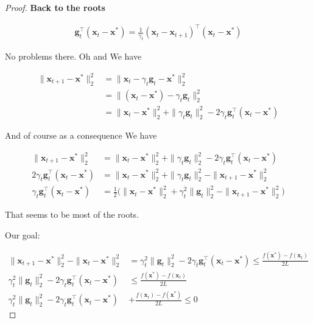 \documentclass{article}
\begin{document}
\begin{proof}
	\textbf{Back to the roots}
	
	\begin{align}
		\mathbf{g}_t^\top(\mathbf{x}_t - \mathbf{x}^*) = \frac{1}{\gamma_t}(\mathbf{x}_t - \mathbf{x}_{t+1})^\top (\mathbf{x}_t - \mathbf{x}^*)
	\end{align}
	
	No problems there. Oh and We have
	
	\begin{align}
		\|\mathbf{x}_{t+1} - \mathbf{x}^*\|^2_2 &= \|\mathbf{x}_t - \gamma_t\mathbf{g}_t - \mathbf{x}^*\|^2_2\\
		&= \|(\mathbf{x}_t - \mathbf{x}^*) - \gamma_t\mathbf{g}_t \|^2_2\\
		&= \|\mathbf{x}_t - \mathbf{x}^*\|^2_2 + \|\gamma_t\mathbf{g}_t \|^2_2 - 2 \gamma_t\mathbf{g}_t^\top(\mathbf{x}_t - \mathbf{x}^*) 
	\end{align}
	
	And of course as a consequence We have 
	
	\begin{align}
		\|\mathbf{x}_{t+1} - \mathbf{x}^*\|^2_2 &= \|\mathbf{x}_t - \mathbf{x}^*\|^2_2 + \|\gamma_t\mathbf{g}_t \|^2_2 - 2 \gamma_t\mathbf{g}_t^\top(\mathbf{x}_t - \mathbf{x}^*) \\
		2 \gamma_t\mathbf{g}_t^\top(\mathbf{x}_t - \mathbf{x}^*)  &= \|\mathbf{x}_t - \mathbf{x}^*\|^2_2 + \|\gamma_t\mathbf{g}_t \|^2_2 - \|\mathbf{x}_{t+1} - \mathbf{x}^*\|^2_2\\
		\gamma_t\mathbf{g}_t^\top(\mathbf{x}_t - \mathbf{x}^*)  &= \frac{1}{2} \big( \|\mathbf{x}_t - \mathbf{x}^*\|^2_2 + \gamma_t^2\|\mathbf{g}_t \|^2_2 - \|\mathbf{x}_{t+1} - \mathbf{x}^*\|^2_2 \big)
	\end{align}
	
	That seems to be most of the roots. 
	
	Our goal:
	
	\begin{align}
		\|\mathbf{x}_{t+1} - \mathbf{x}^*\|^2_2 - \|\mathbf{x}_{t} - \mathbf{x}^*\|^2_2 &= \gamma_t^2\|\mathbf{g}_t\|^2_2 - 2 \gamma_t\mathbf{g}^\top_t(\mathbf{x}_t - \mathbf{x}^*)  \le \frac{f(\mathbf{x}^*) - f(\mathbf{x}_t)}{2L}\\
		\gamma_t^2\|\mathbf{g}_t\|^2_2 - 2 \gamma_t\mathbf{g}^\top_t(\mathbf{x}_t - \mathbf{x}^*)  &\le \frac{f(\mathbf{x}^*) - f(\mathbf{x}_t)}{2L}\\
		\gamma_t^2\|\mathbf{g}_t\|^2_2 - 2 \gamma_t\mathbf{g}^\top_t(\mathbf{x}_t - \mathbf{x}^*) &+ \frac{f(\mathbf{x}_t) - f(\mathbf{x}^*) }{2L}  \le 0
	\end{align}
	

\end{proof}
\end{document}
